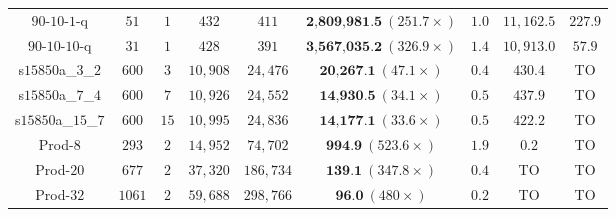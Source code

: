 \begin{tabular}{c|c|c|c|c|c|c|c|c}
$90$-$10$-$1$-q & $51$ & $1$ & $432$ & $411$ & $\textbf{2,809,981.5}~(251.7\times)$ & $1.0$ & $11,162.5$ & $227.9$ \\
$90$-$10$-$10$-q & $31$ & $1$ & $428$ & $391$ & $\textbf{3,567,035.2}~(326.9\times)$ & $1.4$ & $10,913.0$ & $57.9$\\
\midrule
s$15850$a\_$3$\_$2$ & $600$ & $3$ & $10,908$ & $24,476$ & $\textbf{20,267.1}~(47.1\times)$ & $0.4$ & $430.4$ & TO \\
s$15850$a\_$7$\_$4$ & $600$ & $7$ & $10,926$ & $24,552$ & $\textbf{14,930.5}~(34.1\times)$ & $0.5$ & $437.9$ &  TO \\
s$15850$a\_$15$\_$7$ & $600$ & $15$ &  $10,995$ & $24,836$ & $\textbf{14,177.1}~(33.6\times)$ & $0.5$ & $422.2$ & TO \\
\midrule
Prod-$8$  & $293$ & $2$ & $14,952$ & $74,702$ & $\textbf{994.9}~(523.6\times)$ & $1.9$ & $0.2$ & TO \\
Prod-$20$ & $677$ & $2$ & $37,320$ & $186,734$ & $\textbf{139.1}~(347.8\times)$ & $0.4$ & TO &  TO \\
Prod-$32$ & $1061$ & $2$ & $59,688$ & $298,766$ & $\textbf{96.0}~(480\times)$ & $0.2$ & TO &  TO \\
\midrule
\hline
\end{tabular}


